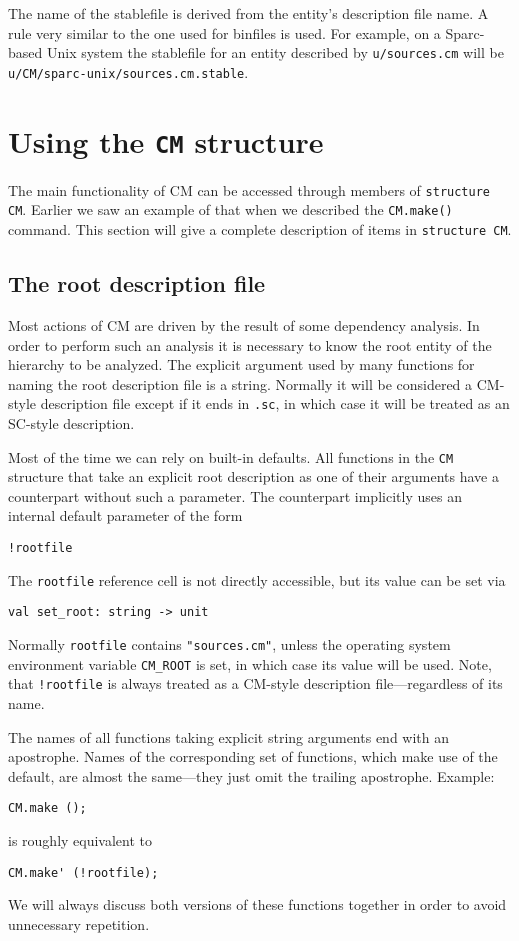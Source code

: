 \documentclass{article}
\begin{document}
The name of the stablefile is derived from the entity's description
file name.  A rule very similar to the one used for binfiles is used.
For example, on a Sparc-based {\sc Unix} system the stablefile for an
entity described by {\tt u/sources.cm} will be {\tt
u/CM/sparc-unix/sources.cm.stable}.

\section{Using the {\tt CM} structure}

The main functionality of CM can be accessed through members of
{\tt structure CM}.  Earlier we saw an example of that when we
described the {\tt CM.make()} command.  This section will
give a complete description of items in {\tt structure CM}.

\subsection{The root description file}

Most actions of CM are driven by the result of some dependency
analysis.  In order to perform such an analysis it is necessary to
know the root entity of the hierarchy to be analyzed.  The explicit
argument used by many functions for naming the root description file
is a string.  Normally it will be considered a CM-style description
file except if it ends in {\tt .sc}, in which case it will be treated
as an SC-style description.

Most of the time we can rely on built-in defaults.  All functions in
the {\tt CM} structure that take an explicit root description as one
of their arguments have a counterpart without such a parameter.  The
counterpart implicitly uses an internal default parameter of the form
\begin{verbatim}
!rootfile
\end{verbatim}
The {\tt rootfile} reference cell is not directly accessible, but
its value can be set via
\begin{verbatim}
val set_root: string -> unit
\end{verbatim}
Normally {\tt rootfile} contains {\tt "sources.cm"}, unless the
operating system environment variable \verb|CM_ROOT| is set, in which
case its value will be used.  Note, that {\tt !rootfile} is always
treated as a CM-style description file---regardless of its name.

The names of all functions taking explicit string arguments end
with an apostrophe.  Names of the corresponding set of functions,
which make use of the default, are almost the same---they just omit
the trailing apostrophe.  Example:
\begin{verbatim}
CM.make ();
\end{verbatim}
is roughly equivalent to
\begin{verbatim}
CM.make' (!rootfile);
\end{verbatim}
We will always discuss both versions of these functions together in
order to avoid unnecessary repetition.
\end{document}
